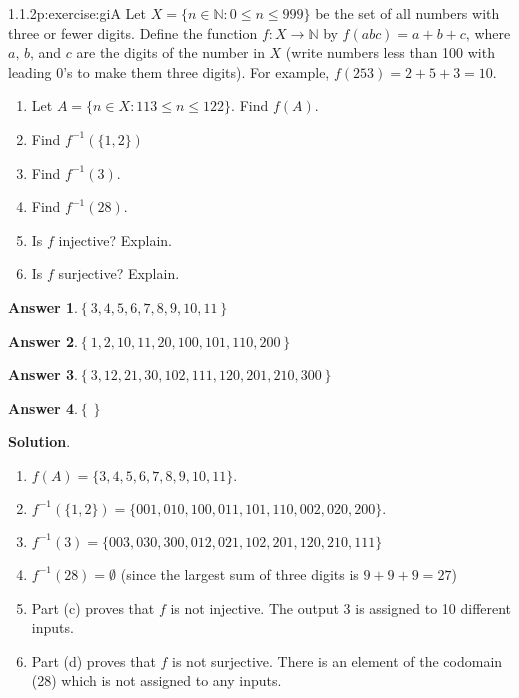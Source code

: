\documentclass[twoside,11pt,]{book}
\newcommand{\blocktitlefont}{\relax}
\numberwithin{equation}{chapter}
\newcommand{\N}{\mathbb N}
\newcommand{\inv}{^{-1}}
\newcommand{\st}{:}
\begin{document}
\begin{divisionsolution}{1.1.2}{}{p:exercise:giA}%
Let \(X = \{n \in \N \st 0 \le n \le 999\}\) be the set of all numbers with three or fewer digits. Define the function \(f:X \to \N\) by \(f(abc) = a+b+c\text{,}\) where \(a\text{,}\) \(b\text{,}\) and \(c\) are the digits of the number in \(X\) (write numbers less than 100 with leading 0's to make them three digits). For example, \(f(253) = 2 + 5 + 3 = 10\text{.}\)%
\begin{enumerate}[label=(\alph*)]
\item{}Let \(A = \{n \in X \st 113 \le n \le 122\}\text{.}\) Find \(f(A)\text{.}\)%
\item{}Find \(f\inv(\{1,2\})\)%
\item{}Find \(f\inv(3)\text{.}\)%
\item{}Find \(f\inv(28)\text{.}\)%
\item{}Is \(f\) injective? Explain.%
\item{}Is \(f\) surjective? Explain.%
\end{enumerate}
%
\par\smallskip%
\noindent\textbf{\blocktitlefont Answer 1}.\quad{}\(\left\{3,4,5,6,7,8,9,10,11\right\}\)%
\par\smallskip%
\noindent\textbf{\blocktitlefont Answer 2}.\quad{}\(\left\{1,2,10,11,20,100,101,110,200\right\}\)%
\par\smallskip%
\noindent\textbf{\blocktitlefont Answer 3}.\quad{}\(\left\{3,12,21,30,102,111,120,201,210,300\right\}\)%
\par\smallskip%
\noindent\textbf{\blocktitlefont Answer 4}.\quad{}\(\left\{\right\}\)%
\par\smallskip%
\noindent\textbf{\blocktitlefont Solution}.\quad{}%
\begin{enumerate}[label=(\alph*)]
\item{}\(f(A) = \{3,4,5,6,7,8,9,10,11\}\text{.}\)%
\item{}\(f\inv(\{1,2\}) = \{001, 010, 100, 011, 101, 110, 002, 020, 200\}\text{.}\)%
\item{}\(f\inv(3) = \{003, 030, 300, 012, 021, 102, 201, 120, 210, 111\}\)%
\item{}\(f\inv(28) = \emptyset\) (since the largest sum of three digits is \(9+9+9 = 27\))%
\item{}Part (c) proves that \(f\) is not injective. The output 3 is assigned to 10 different inputs.%
\item{}Part (d) proves that \(f\) is not surjective. There is an element of the codomain (28) which is not assigned to any inputs.%
\end{enumerate}
%
\end{divisionsolution}%
\end{document}

